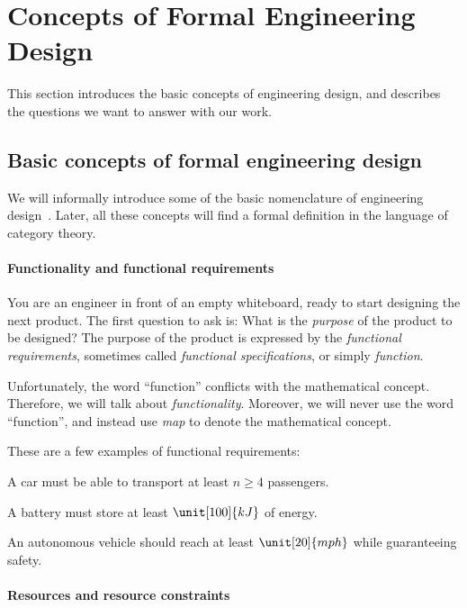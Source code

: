 \section{Concepts of  Formal Engineering Design}
This section introduces the basic concepts of engineering design, and describes the questions we want to answer with our work.

\subsection{Basic concepts of formal engineering design}
We will informally introduce some of the basic nomenclature of engineering
design~\cite{book-formal-engineering-design}. Later, all these concepts will find a formal
definition in the language of category theory.

\paragraph{Functionality and functional requirements}
You are an engineer in front of an empty whiteboard, ready to start designing the next product.
The first question to ask is: What is the \emph{purpose} of the product to be designed? The purpose of the product is expressed by the \emph{functional requirements}, sometimes called
\emph{functional specifications}, or simply \emph{function}.

Unfortunately, the word ``function'' conflicts with the mathematical concept. Therefore, we
will talk  about \emph{functionality}. Moreover, we will never use the word ``function'', and
instead use \emph{map} to denote the mathematical concept.

\begin{example}
    These are a few examples of functional requirements:

    \begin{compactitem}
        \item A car must be able to transport at least $n \geq 4$ passengers.
        \item A battery must store at least $\unit[100]{kJ}$ of energy.
        \item An autonomous vehicle should reach at least $\unit[20]{mph}$ while guaranteeing safety.
    \end{compactitem}
\end{example}

\paragraph{Resources and resource constraints}

